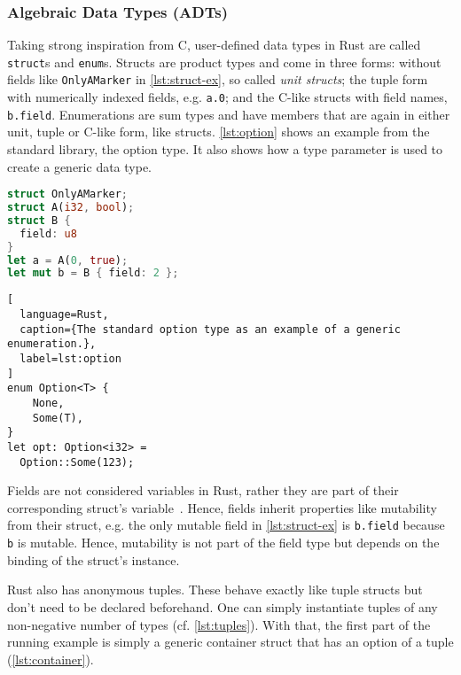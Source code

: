\subsubsection{Algebraic Data Types (ADTs)}

Taking strong inspiration from C, user-defined data types in Rust are called
\lstinline!struct!s and \lstinline!enum!s. Structs are product types and come in
three forms: without fields like \lstinline!OnlyAMarker! in
\autoref{lst:struct-ex}, so called \emph{unit structs}; the tuple form with
numerically indexed fields, e.g. \lstinline!a.0!; and the C-like structs with
field names, \lstinline!b.field!. Enumerations are sum types and have members
that are again in either unit, tuple or C-like form, like structs.
\autoref{lst:option} shows  an example from the standard library, the option
type. It also shows how a type parameter is used to create a generic data type.

\noindent\begin{minipage}[t]{.45\textwidth}
\begin{lstlisting}[language=Rust, caption={All three types of structs.}, label=lst:struct-ex]
struct OnlyAMarker;
struct A(i32, bool);
struct B {
  field: u8
}
let a = A(0, true);
let mut b = B { field: 2 };
\end{lstlisting}
\end{minipage}\hfill
\begin{minipage}[t]{.45\textwidth}
\begin{lstlisting}[
  language=Rust,
  caption={The standard option type as an example of a generic enumeration.},
  label=lst:option
]
enum Option<T> {
    None,
    Some(T),
}
let opt: Option<i32> =
  Option::Some(123);
\end{lstlisting}
\end{minipage}

Fields are not considered variables in Rust, rather they are part of their
corresponding struct's variable~\cite{rustref}. Hence, fields inherit properties
like mutability from their struct, e.g. the only mutable field in
\autoref{lst:struct-ex} is \lstinline!b.field! because \lstinline!b! is mutable.
Hence, mutability is not part of the field type but depends on the binding of
the struct's instance.

Rust also has anonymous tuples. These behave exactly like tuple structs but
don't need to be declared beforehand. One can simply instantiate tuples of any
non-negative number of types (cf. \autoref{lst:tuples}). With that, the first
part of the running example is simply a generic container struct that has an
option of a tuple (\autoref{lst:container}).

